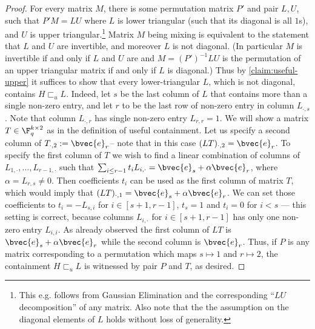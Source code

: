 \documentclass[11pt]{article}
\newcommand{\usef}{\sqsubset_u}
\begin{document}
\begin{proof}
	For every matrix $M$, there is some permutation matrix $P'$ and pair $L, U$, such that $P'M = L U$ where $L$ is lower triangular (such that its diagonal is all $1$s), and $U$ is upper triangular.\footnote{This e.g. follows from Gaussian Elimination and the corresponding ``$LU$ decomposition'' of any matrix. Also note that the the assumption on the diagonal elements of $L$ holds without loss of generality.} 
	Matrix $M$ being mixing is equivalent to the statement that $L$ and $U$ are invertible, and moreover $L$ is not diagonal. (In particular $M$ is invertible if and only if $L$ and $U$ are and $M = (P')^{-1}LU$ is the permutation of an upper triangular matrix if and only if $L$ is diagonal.) 
	Thus by \cref{claim:useful-upper} it suffices to show that every lower-triangular $L$, which is not diagonal, contains $H
	\usef L$. 
	Indeed, let $s$ be the last column of $L$ that contains more than a single non-zero entry, and let $r$ to be the last row of non-zero entry in column $L_{\cdot, s}$. Note that column $L_{\cdot, r}$ has single non-zero entry $L_{r,r} = 1$. We will show a matrix $T \in \F_q^{k \times 2}$ as in the definition of useful containment. Let us specify a second column of $T_{\cdot, 2} := \bvec{e}_r$-- note that in this case $(LT)_{\cdot,2}=\bvec{e}_r$. To specify the first column of $T$ we wish to find a linear combination of columns of $L_{1, \cdot}, \ldots, L_{r-1, \cdot}$ such that $\sum_{i\leq r-1} t_{i} L_{i, \cdot} = \bvec{e}_s + \alpha \bvec{e}_r$, where $\alpha=L_{r,s}\ne 0$. Then coefficients $t_i$ can be used as the first column of matrix $T$, which would imply that $(LT)_{\cdot,1}=\bvec{e}_s + \alpha \bvec{e}_r$. We can set those coefficients to $t_{i} = - L_{s, i}$ for $i \in [s+1, r-1]$, $t_s = 1$ and $t_i=0$ for $i<s$ --- this setting is correct, because columns $L_{i,\cdot}$ for $i \in [s+1, r-1]$ has only one non-zero entry $L_{i,i}$. As already observed the first column of $LT$ is $\bvec{e}_s + \alpha \bvec{e}_r$ while the second column is $\bvec{e}_r$. Thus, if $P$ is any matrix corresponding to a permutation which maps $s \mapsto 1$ and $r \mapsto 2$, the containment $H \usef L$ is witnessed by pair $P$ and $T$, as desired.
\end{proof}
\end{document}
